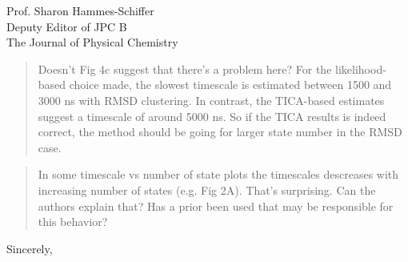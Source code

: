 \documentclass{letter}
\begin{document}
\begin{letter}{Prof. Sharon Hammes-Schiffer \\ Deputy Editor of JPC B \\ The Journal of Physical Chemistry}
\begin{quote}
 Doesn’t Fig 4c suggest that there’s a problem here? For the likelihood-based choice made, the slowest timescale is estimated between 1500 and 3000 ns with RMSD clustering. In contrast, the TICA-based estimates suggest a timescale of around 5000 ns. So if the TICA results is indeed correct, the method should be going for larger state number in the RMSD case.
\end{quote}

\begin{quote}
In some timescale vs number of state plots the timescales descreases with increasing number of states (e.g. Fig 2A). That’s surprising. Can the authors explain that? Has a prior been used that may be responsible for this behavior?
\end{quote}


\closing{Sincerely,}



\end{letter}
\end{document}
